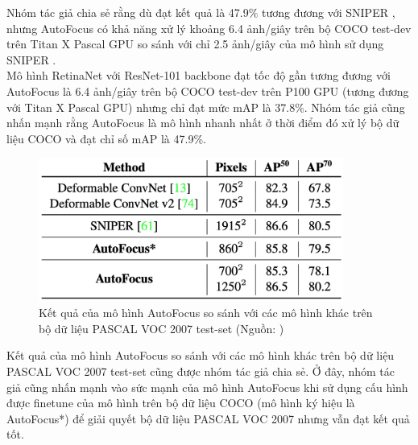 {    \noindent
    Nhóm tác giả chia sẻ rằng dù đạt kết quả là 47.9\% tương đương với SNIPER , nhưng AutoFocus có khả năng xử lý khoảng 6.4 ảnh/giây trên bộ COCO test-dev trên Titan X Pascal GPU so sánh với chỉ 2.5 ảnh/giây của mô hình sử dụng SNIPER . \\
    Mô hình RetinaNet với ResNet-101 backbone đạt tốc độ gần tương đương với AutoFocus là 6.4 ảnh/giây trên bộ COCO test-dev trên P100 GPU (tương đương với Titan X Pascal GPU) nhưng chỉ đạt mức mAP là 37.8\%.
    Nhóm tác giả cũng nhấn mạnh rằng AutoFocus là mô hình nhanh nhất ở thời điểm đó xử lý bộ dữ liệu COCO và đạt chỉ số mAP là 47.9\%.

    \begin{figure}[H]
        \centering
        \includegraphics[width=10cm] {images/autofocus_results_2}
        \caption{Kết quả của mô hình AutoFocus so sánh với các mô hình khác trên bộ dữ liệu PASCAL VOC 2007 test-set (Nguồn: \cite{najibi2019autofocus})}
        \label{fig:autofocus_results_2}
    \end{figure}

    \noindent
    Kết quả của mô hình AutoFocus so sánh với các mô hình khác trên bộ dữ liệu PASCAL VOC 2007 test-set cũng được nhóm tác giả chia sẻ.
    Ở đây, nhóm tác giả cũng nhấn mạnh vào sức mạnh của mô hình AutoFocus khi sử dụng cấu hình được finetune của mô hình trên bộ dữ liệu COCO (mô hình ký hiệu là AutoFocus*) để giải quyết bộ dữ liệu PASCAL VOC 2007 nhưng vẫn đạt kết quả tốt.

}
